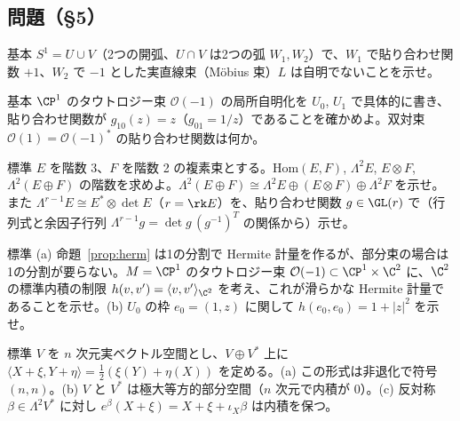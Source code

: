 \subsection*{問題（§5）}
\begin{prob}{基本}\label{p:mobius}
$S^1=U\cup V$（2つの開弧、$U\cap V$ は2つの弧 $W_1,W_2$）で、$W_1$ で貼り合わせ関数 $+1$、$W_2$ で $-1$ とした実直線束（Möbius 束）$L$ は自明でないことを示せ。
\end{prob}
\begin{prob}{基本}\label{p:taut}
$\CP^1$ のタウトロジー束 $\mathcal O(-1)$ の局所自明化を $U_0$, $U_1$ で具体的に書き、貼り合わせ関数が $g_{10}(z)=z$（$g_{01}=1/z$）であることを確かめよ。双対束 $\mathcal O(1)=\mathcal O(-1)^*$ の貼り合わせ関数は何か。
\end{prob}
\begin{prob}{標準}\label{p:constr}
$E$ を階数 3、$F$ を階数 2 の複素束とする。$\mathrm{Hom}(E,F)$, $\Lambda^2E$, $E\otimes F$, $\Lambda^2(E\oplus F)$ の階数を求めよ。$\Lambda^2(E\oplus F)\cong\Lambda^2E\oplus(E\otimes F)\oplus\Lambda^2F$ を示せ。また $\Lambda^{r-1}E\cong E^*\otimes\det E$（$r=\rk E$）を、貼り合わせ関数 $g\in\GL(r)$ で（行列式と余因子行列 $\Lambda^{r-1}g=\det g\,(g^{-1})^T$ の関係から）示せ。
\end{prob}
\begin{prob}{標準}\label{p:hermexist}
(a) 命題~\ref{prop:herm} は1の分割で Hermite 計量を作るが、部分束の場合は1の分割が要らない。$M=\CP^1$ のタウトロジー束 $\mathcal O(-1)\subset\CP^1\times\C^2$ に、$\C^2$ の標準内積の制限 $h(v,v')=\langle v,v'\rangle_{\C^2}$ を考え、これが滑らかな Hermite 計量であることを示せ。(b) $U_0$ の枠 $e_0=(1,z)$ に関して $h(e_0,e_0)=1+|z|^2$ を示せ。
\end{prob}
\begin{prob}{標準}\label{p:pairing}
$V$ を $n$ 次元実ベクトル空間とし、$V\oplus V^*$ 上に $\langle X+\xi,Y+\eta\rangle=\frac12(\xi(Y)+\eta(X))$ を定める。(a) この形式は非退化で符号 $(n,n)$。(b) $V$ と $V^*$ は極大等方的部分空間（$n$ 次元で内積が $0$）。(c) 反対称 $\beta\in\Lambda^2V^*$ に対し $e^\beta(X+\xi)=X+\xi+\iota_X\beta$ は内積を保つ。
\end{prob}
